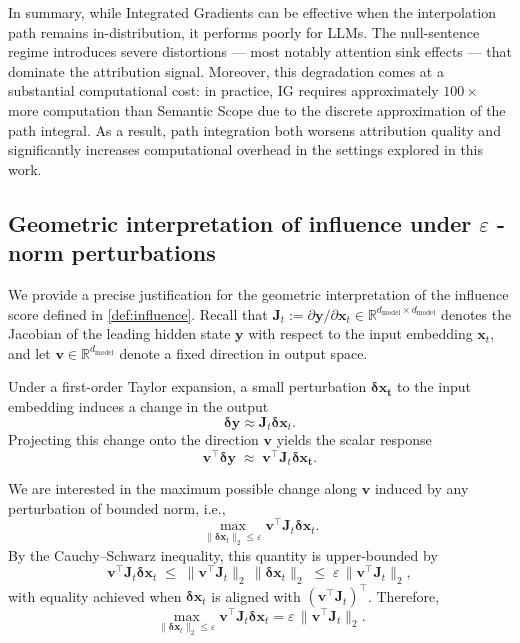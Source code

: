 \documentclass{article}
\begin{document}
In summary, while Integrated Gradients can be effective when the interpolation path remains in-distribution, it performs poorly for LLMs.
The null-sentence regime introduces severe distortions — most notably attention sink effects — that dominate the attribution signal.
Moreover, this degradation comes at a substantial computational cost: in practice, IG requires approximately $100\times$ more computation than Semantic Scope due to the discrete approximation of the path integral.
As a result, path integration both worsens attribution quality and significantly increases computational overhead in the settings explored in this work.

\subsection{Geometric interpretation of influence under \texorpdfstring{$\varepsilon$}{ep}
-norm perturbations}
\label{app:epsilon_perturbation}

We provide a precise justification for the geometric interpretation of the influence score defined in \cref{def:influence}.
Recall that $\bm{J}_t := \partial \bm{y} / \partial \bm{x}_t \in \mathbb{R}^{d_{\text{model}} \times d_{\text{model}}}$ denotes the Jacobian of the leading hidden state $\bm{y}$ with respect to the input embedding $\bm{x}_t$, and let $\bm{v} \in \mathbb{R}^{d_{\text{model}}}$ denote a fixed direction in output space.

Under a first-order Taylor expansion, a small perturbation $\bm{\delta x_t}$ to the input embedding induces a change in the output
\[
 \bm{\delta y} \approx\bm{J}_t \bm{\delta x}_t.
\]
Projecting this change onto the direction $\bm{v}$ yields the scalar response
\[
\bm{v}^\intercal \bm{\delta y}
\;\approx\;
\bm{v}^\intercal \bm{J}_t\bm{\delta x_t}.
\]

We are interested in the maximum possible change along $\bm{v}$ induced by any perturbation of bounded norm, i.e.,
\[
\max_{\|\bm{\delta x}_t\|_2 \le \varepsilon}
\bm{v}^\intercal \bm{J}_t \bm{\delta x}_t.
\]
By the Cauchy--Schwarz inequality, this quantity is upper-bounded by
\[
\bm{v}^\intercal \bm{J}_t \bm{\delta x}_t
\;\le\;
\|\bm{v}^\intercal \bm{J}_t\|_2 \, \|\bm{\delta x}_t\|_2
\;\le\;
\varepsilon \, \|\bm{v}^\intercal \bm{J}_t\|_2,
\]
with equality achieved when $\bm{\delta x}_t$ is aligned with $(\bm{v}^\intercal \bm{J}_t)^\intercal$.
Therefore,
\[
\max_{\|\bm{\delta x}_t\|_2 \le \varepsilon}
\bm{v}^\intercal \bm{J}_t \bm{\delta x}_t
=
\varepsilon \, \|\bm{v}^\intercal \bm{J}_t\|_2.
\]
\end{document}

